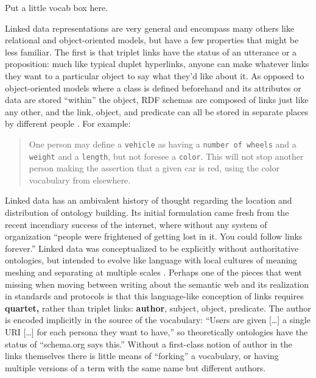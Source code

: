 Put a little vocab box here.

Linked data representations are very general and encompass many others
like relational \citep{berners-leeRelationalDatabasesSemantic2009}  and object-oriented models, but have a few properties that might be
less familiar. The first is that triplet links have the status of an
utterance or a proposition: much like typical duplet hyperlinks, anyone
can make whatever links they want to a particular object to say what
they'd like about it. As opposed to object-oriented models where a class
is defined beforehand and its attributes or data are stored ``within''
the object, RDF schemas are composed of links just like any other, and
the link, object, and predicate can all be stored in separate places by
different people \citep{berners-leeWhatSemanticWeb1998} . For
example:

\begin{quote}
One person may define a \texttt{vehicle} as having a
\texttt{number\ of\ wheels} and a \texttt{weight} and a \texttt{length},
but not foresee a \texttt{color}. This will not stop another person
making the assertion that a given car is red, using the color vocabulary
from elsewhere. \citep{berners-leeWhatSemanticWeb1998} 
\end{quote}

Linked data has an ambivalent history of thought regarding the location
and distribution of ontology building. Its initial formulation came
fresh from the recent incendiary success of the internet, where without
any system of organization ``people were frightened of getting lost in
it. You could follow links forever.'' \citep{berners-leeWhatSemanticWeb1998}  Linked data was conceptualized to be
explicitly without authoritative ontologies, but intended to evolve like
language with local cultures of meaning meshing and separating at
multiple scales \citep{berners-leeSemanticWeb2001} . Perhaps one
of the pieces that went missing when moving between writing about the
semantic web and its realization in standards and protocols is that this
language-like conception of links requires \textbf{quartet,} rather than
triplet links: \textbf{author}, subject, object, predicate. The author
is encoded implicitly in the source of the vocabulary: ``Users are given
{[}\ldots{]} a single URI {[}\ldots{]} for each persona they want to
have,'' \citep{berners-leeSociallyAwareCloud2009}  so
theoretically ontologies have the status of ``schema.org says this.''
Without a first-class notion of author in the links themselves there is
little means of ``forking'' a vocabulary, or having multiple versions of
a term with the same name but different authors.

